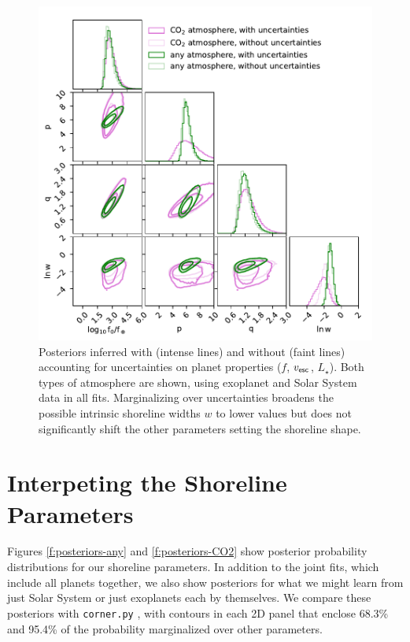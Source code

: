 \documentclass[modern,linenumbers,trackchanges]{aastex7}
\begin{document}
\begin{figure}[ht!]
\includegraphics[width=\textwidth]{figures/posteriors-with-and-without-uncertainties.pdf}

\caption{Posteriors inferred with (intense lines) and without (faint lines) accounting for uncertainties on planet properties ($f$, $v_{\sf esc}$, $L_\star$). Both types of atmosphere are shown, using exoplanet and Solar System data in all fits. Marginalizing over uncertainties broadens the possible intrinsic shoreline widths $w$ to lower values but does not significantly shift the other parameters setting the shoreline shape.}
\label{f:posteriors-uncertainties}
\end{figure}


\section{Interpeting the Shoreline Parameters}
\label{s:slopes}

Figures \ref{f:posteriors-any} and  \ref{f:posteriors-CO2} show posterior probability distributions for our shoreline parameters. In addition to the joint fits, which include all planets together, we also show posteriors for what we might learn from just Solar System or just exoplanets each by themselves. We compare these posteriors with \texttt{corner.py} \citep{foreman-mackeyCornerpyScatterplotMatrices2016}, with contours in each 2D panel that enclose 68.3\% and 95.4\% of the probability marginalized over other parameters. 
\end{document}
